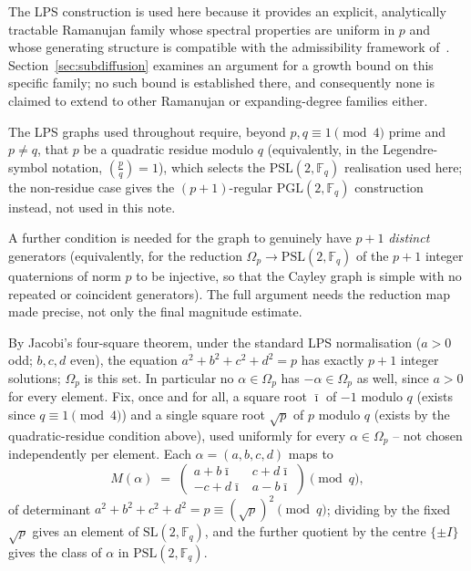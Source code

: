 \documentclass[11pt,a4paper]{article}
\theoremstyle{definition}
\theoremstyle{remark}
\begin{document}
    The LPS construction is used here because it provides an explicit, analytically tractable
    Ramanujan family whose spectral properties are uniform in $p$ and whose generating
    structure is compatible with the admissibility framework of~\cite{Beau2026a1}.
    Section~\ref{sec:subdiffusion} examines an argument for a growth bound on this specific
    family; no such bound is established there, and consequently none is claimed to extend to
    other Ramanujan or expanding-degree families either.

    The LPS graphs used throughout require, beyond $p,q \equiv 1 \pmod 4$ prime and $p \neq q$,
    that $p$ be a quadratic residue modulo $q$ (equivalently, in the Legendre-symbol notation,
    $\left(\tfrac{p}{q}\right) = 1$), which selects the $\mathrm{PSL}(2,\mathbb{F}_q)$
    realisation used here; the non-residue case gives the $(p+1)$-regular
    $\mathrm{PGL}(2,\mathbb{F}_q)$ construction instead, not used in this note.

    A further condition is needed for the graph to genuinely have $p+1$ \emph{distinct}
    generators (equivalently, for the reduction $\Omega_p \to \mathrm{PSL}(2,\mathbb F_q)$ of
    the $p+1$ integer quaternions of norm $p$ to be injective, so that the Cayley graph is
    simple with no repeated or coincident generators).
    The full argument needs the reduction map made precise, not only the final magnitude
    estimate.

    By Jacobi's four-square theorem, under the standard LPS normalisation ($a>0$ odd; $b,c,d$
    even), the equation $a^2+b^2+c^2+d^2=p$ has exactly $p+1$ integer solutions; $\Omega_p$ is
    this set.
    In particular no $\alpha \in \Omega_p$ has $-\alpha \in \Omega_p$ as well, since $a>0$ for
    every element.
    Fix, once and for all, a square root $\bar\imath$ of $-1$ modulo $q$ (exists since
    $q\equiv1\pmod4$) and a single square root $\sqrt p$ of $p$ modulo $q$ (exists by the
    quadratic-residue condition above), used uniformly for every $\alpha\in\Omega_p$ -- not
    chosen independently per element.
    Each $\alpha=(a,b,c,d)$ maps to
    \[
    M(\alpha) \;=\; \begin{pmatrix} a+b\bar\imath & c+d\bar\imath \\ -c+d\bar\imath &
    a-b\bar\imath \end{pmatrix} \pmod q,
    \]
    of determinant $a^2+b^2+c^2+d^2=p \equiv (\sqrt p)^2 \pmod q$; dividing by the fixed
    $\sqrt p$ gives an element of $\mathrm{SL}(2,\mathbb F_q)$, and the further quotient by the
    centre $\{\pm I\}$ gives the class of $\alpha$ in $\mathrm{PSL}(2,\mathbb F_q)$.
\end{document}

